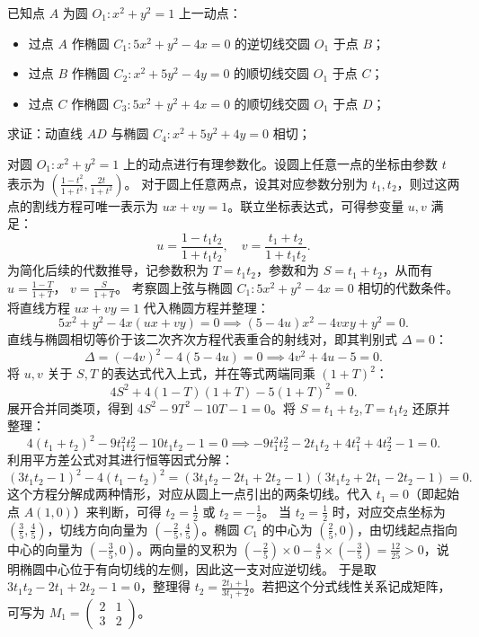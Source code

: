 \begin{example}
已知点 \(A\) 为圆 \(O_1: x^2 + y^2 = 1\) 上一动点：
\begin{itemize}
\item 过点 \(A\) 作椭圆 \(C_1: 5x^2 + y^2 - 4x = 0\) 的逆切线交圆 \(O_1\) 于点 \(B\)；
\item 过点 \(B\) 作椭圆 \(C_2: x^2 + 5y^2 - 4y = 0\) 的顺切线交圆 \(O_1\) 于点 \(C\)；
\item 过点 \(C\) 作椭圆 \(C_3: 5x^2 + y^2 + 4x = 0\) 的顺切线交圆 \(O_1\) 于点 \(D\)；
\end{itemize}
求证：动直线 \(AD\) 与椭圆 \(C_4: x^2 + 5y^2 + 4y = 0\) 相切；
\end{example}
\begin{solution}
对圆 $O_1: x^2 + y^2 = 1$ 上的动点进行有理参数化。设圆上任意一点的坐标由参数 $t$ 表示为 $\left( \frac{1-t^2}{1+t^2}, \frac{2t}{1+t^2} \right)$。
对于圆上任意两点，设其对应参数分别为 $t_1, t_2$，则过这两点的割线方程可唯一表示为 $ux + vy = 1$。联立坐标表达式，可得参变量 $u, v$ 满足：
\[
u = \frac{1-t_1t_2}{1+t_1t_2}, \quad v = \frac{t_1+t_2}{1+t_1t_2}.
\]
为简化后续的代数推导，记参数积为 $T = t_1t_2$，参数和为 $S = t_1+t_2$，从而有 $u = \frac{1-T}{1+T}$， $v = \frac{S}{1+T}$。
考察圆上弦与椭圆 $C_1: 5x^2 + y^2 - 4x = 0$ 相切的代数条件。将直线方程 $ux + vy = 1$ 代入椭圆方程并整理：
\[
5x^2 + y^2 - 4x(ux+vy) = 0 \implies (5-4u)x^2 - 4vxy + y^2 = 0.
\]
直线与椭圆相切等价于该二次齐次方程代表重合的射线对，即其判别式 $\Delta = 0$：
\[
\Delta = (-4v)^2 - 4(5-4u) = 0 \implies 4v^2 + 4u - 5 = 0.
\]
将 $u, v$ 关于 $S, T$ 的表达式代入上式，并在等式两端同乘 $(1+T)^2$：
\[
4S^2 + 4(1-T)(1+T) - 5(1+T)^2 = 0.
\]
展开合并同类项，得到 $4S^2 - 9T^2 - 10T - 1 = 0$。将 $S = t_1+t_2, T = t_1t_2$ 还原并整理：
\[
4(t_1+t_2)^2 - 9t_1^2t_2^2 - 10t_1t_2 - 1 = 0 \implies -9t_1^2t_2^2 - 2t_1t_2 + 4t_1^2 + 4t_2^2 - 1 = 0.
\]
利用平方差公式对其进行恒等因式分解：
\[
(3t_1t_2 - 1)^2 - 4(t_1 - t_2)^2 = (3t_1t_2 - 2t_1 + 2t_2 - 1)(3t_1t_2 + 2t_1 - 2t_2 - 1) = 0.
\]
这个方程分解成两种情形，对应从圆上一点引出的两条切线。代入 $t_1 = 0$（即起始点 $A(1,0)$）来判断，可得 $t_2 = \frac{1}{2}$ 或 $t_2 = -\frac{1}{2}$。
当 $t_2 = \frac{1}{2}$ 时，对应交点坐标为 $\left(\frac{3}{5}, \frac{4}{5}\right)$，切线方向向量为 $\left(-\frac{2}{5}, \frac{4}{5}\right)$。椭圆 $C_1$ 的中心为 $\left(\frac{2}{5}, 0\right)$，由切线起点指向中心的向量为 $\left(-\frac{3}{5}, 0\right)$。两向量的叉积为 $\left(-\frac{2}{5}\right) \times 0 - \frac{4}{5} \times \left(-\frac{3}{5}\right) = \frac{12}{25} > 0$，说明椭圆中心位于有向切线的左侧，因此这一支对应逆切线。
于是取 $3t_1t_2 - 2t_1 + 2t_2 - 1 = 0$，整理得 $t_2 = \frac{2t_1+1}{3t_1+2}$。若把这个分式线性关系记成矩阵，可写为 $M_1 = \begin{pmatrix} 2 & 1 \\ 3 & 2 \end{pmatrix}$。

\end{solution}
